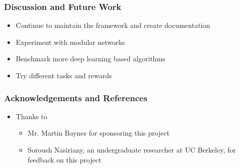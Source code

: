 \documentclass[12pt,handout]{beamer}
\begin{document}
\begin{frame}
    \frametitle{Discussion and Future Work}
    \begin{itemize}
        \item{Continue to maintain the framework and create documentation}
        \item{Experiment with modular networks}
        \item{Benchmark more deep learning based algorithms}
        \item{Try different tasks and rewards}
    \end{itemize}
\end{frame}
\begin{frame}
    \frametitle{Acknowledgements and References}
    \begin{itemize}
        \item{Thanks to}
        \begin{itemize}
            \item{Mr. Martin Baynes for sponsoring this project}
            \item{Soroush Nasiriany, an undergraduate researcher at UC Berkeley, for feedback on this project}
        \end{itemize}
    \end{itemize}
\end{frame}
\end{document}
